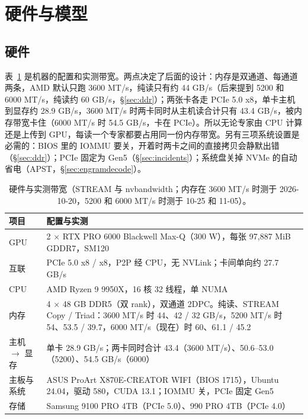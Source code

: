 \documentclass[11pt,a4paper]{article}
\begin{document}
\section{硬件与模型}

\subsection{硬件}

表~\ref{tab:hw} 是机器的配置和实测带宽。两点决定了后面的设计：内存是双通道、每通道两条，AMD 默认只跑 3600 MT/s，纯读只有约 44 GB/s（后来提到 5200 和 6000 MT/s，纯读约 60 GB/s，\S\ref{sec:ddr}）；两张卡各走 PCIe 5.0 x8，单卡主机到显存约 28.9 GB/s，3600 MT/s 时两卡同时从主机读合计只有 43.4 GB/s，被内存带宽卡住（6000 MT/s 时 54.5 GB/s，卡在 PCIe）。所以无论专家由 CPU 计算还是上传到 GPU，每读一个专家都要占用同一份内存带宽。另有三项系统设置是必需的：BIOS 里的 IOMMU 要关，开着时两卡之间的直接拷贝会静默出错（\S\ref{sec:ddr}）；PCIe 固定为 Gen5（\S\ref{sec:incidents}）；系统盘关掉 NVMe 的自动省电（APST，\S\ref{sec:engramdecode}）。

\begin{table}[h]
  \centering
  \small
  \caption{硬件与实测带宽（STREAM 与 nvbandwidth；内存在 3600 MT/s 时测于 2026-10-20，5200 和 6000 MT/s 时测于 10-25 和 11-05）。}
  \label{tab:hw}
  \begin{tabularx}{\textwidth}{@{}l X@{}}
    \toprule
    项目 & 配置与实测 \\
    \midrule
    GPU & 2 × RTX PRO 6000 Blackwell Max-Q（300 W），每张 97,887 MiB GDDR7，SM120 \\
    互联 & PCIe 5.0 x8 / x8，P2P 经 CPU，无 NVLink；卡间单向约 27.7 GB/s \\
    CPU & AMD Ryzen 9 9950X，16 核 32 线程，单 NUMA \\
    内存 & 4 × 48 GB DDR5（双 rank），双通道 2DPC。纯读、STREAM Copy / Triad：3600 MT/s 时 44、42 / 32 GB/s，5200 MT/s 时 54、53.5 / 39.7，6000 MT/s（现在）时 60、61.1 / 45.2 \\
    主机 $\to$ 显存 & 单卡 28.9 GB/s；两卡同时合计 43.4（3600 MT/s）、50.6--53.0（5200）、54.5 GB/s（6000） \\
    主板与系统 & ASUS ProArt X870E-CREATOR WIFI（BIOS 1715），Ubuntu 24.04，驱动 580，CUDA 13.1；IOMMU 关，PCIe 固定 Gen5 \\
    存储 & Samsung 9100 PRO 4TB（PCIe 5.0）、990 PRO 4TB（PCIe 4.0） \\
    \bottomrule
  \end{tabularx}
\end{table}
\end{document}
